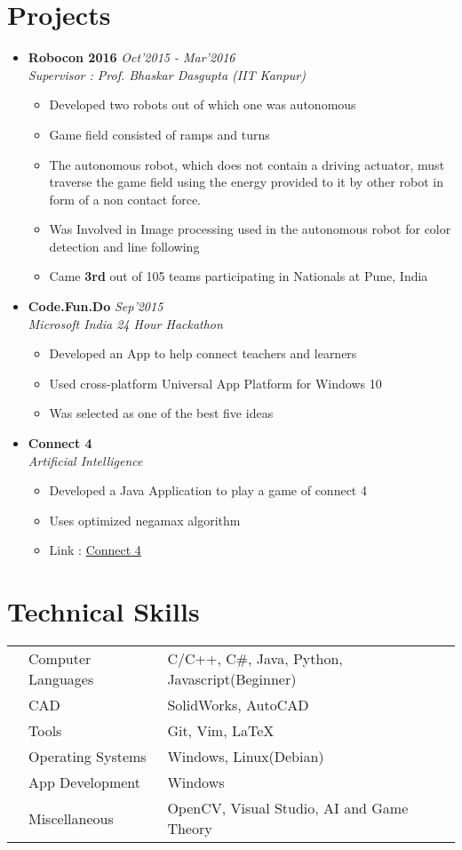 \documentclass[11pt,a4paper]{moderncv}
\newcommand{\experience}[3]{
  \item \textbf{\large{#1}} \hfill\textit{#2}\\ \emph{#3}
}
\begin{document}
  \section{Projects}
    \begin{itemize}
      \experience{Robocon 2016}{Oct'2015 - Mar'2016}{Supervisor : Prof. Bhaskar Dasgupta (IIT Kanpur)}
      \begin{itemize}
        \item Developed two robots out of which one was autonomous
        \item Game field consisted of ramps and turns
        \item The autonomous robot, which does not contain a driving actuator, must traverse the game field using the energy provided to it by other robot in form of a non contact force.
        \item Was Involved in Image processing used in the autonomous robot for color detection and line following
        \item Came \textbf{3rd} out of 105 teams participating in Nationals at Pune, India
      \end{itemize}
      \experience{Code.Fun.Do}{Sep'2015}{Microsoft India 24 Hour Hackathon}
      \begin{itemize}
        \item Developed an App to help connect teachers and learners
        \item Used cross-platform Universal App Platform for Windows 10
        \item Was selected as one of the best five ideas
      \end{itemize}
      \experience{Connect 4}{}{Artificial Intelligence}
      \begin{itemize}
        \item Developed a Java Application to play a game of connect 4
        \item Uses optimized negamax algorithm
        \item Link : \href{http://github.com/yashsriv/Connect-4}{Connect 4}
      \end{itemize}
    \end{itemize}
  \section{Technical Skills}
  \begin{tabular}{L{0.05cm} L{6cm} l}
      & Computer Languages   & C/C++, C\#, Java, Python, Javascript(Beginner)\\
      & CAD                  & SolidWorks, AutoCAD \\
      & Tools                & Git, Vim, \LaTeX \\
      & Operating Systems    & Windows, Linux(Debian)\\
      & App Development      & Windows \\
      & Miscellaneous        & OpenCV, Visual Studio, AI and Game Theory
    \end{tabular}
\end{document}
